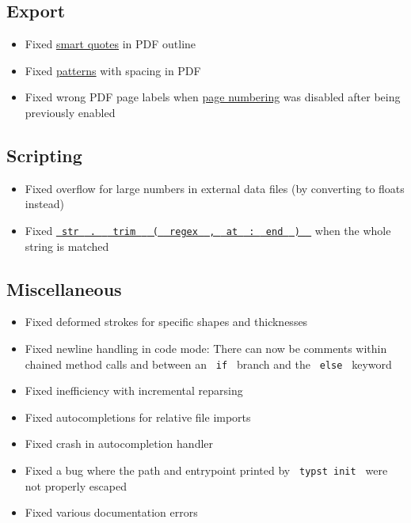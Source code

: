 \subsection{Export}\label{export}

\begin{itemize}
\tightlist
\item
  Fixed \href{/docs/reference/text/smartquote/}{smart quotes} in PDF
  outline
\item
  Fixed \href{/docs/reference/visualize/pattern/}{patterns} with spacing
  in PDF
\item
  Fixed wrong PDF page labels when
  \href{/docs/reference/layout/page/\#parameters-numbering}{page
  numbering} was disabled after being previously enabled
\end{itemize}

\subsection{Scripting}\label{scripting}

\begin{itemize}
\tightlist
\item
  Fixed overflow for large numbers in external data files (by converting
  to floats instead)
\item
  Fixed
  \href{/docs/reference/foundations/str/\#definitions-trim}{\texttt{\ str\ }{\texttt{\ .\ }}\texttt{\ }{\texttt{\ trim\ }}\texttt{\ }{\texttt{\ (\ }}\texttt{\ regex\ }{\texttt{\ ,\ }}\texttt{\ at\ }{\texttt{\ :\ }}\texttt{\ end\ }{\texttt{\ )\ }}\texttt{\ }}
  when the whole string is matched
\end{itemize}

\subsection{Miscellaneous}\label{miscellaneous}

\begin{itemize}
\tightlist
\item
  Fixed deformed strokes for specific shapes and thicknesses
\item
  Fixed newline handling in code mode: There can now be comments within
  chained method calls and between an \texttt{\ if\ } branch and the
  \texttt{\ else\ } keyword
\item
  Fixed inefficiency with incremental reparsing
\item
  Fixed autocompletions for relative file imports
\item
  Fixed crash in autocompletion handler
\item
  Fixed a bug where the path and entrypoint printed by
  \texttt{\ typst\ init\ } were not properly escaped
\item
  Fixed various documentation errors
\end{itemize}

